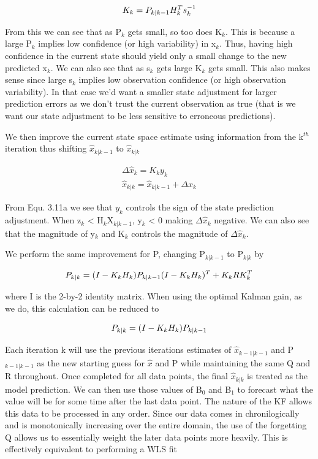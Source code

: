     \begin{equation}
  \centering
K_{k} = P_{k|k-1}H_{k}^{T}s_{k}^{-1}
  \end{equation}
  
  From this we can see that as P$_{k}$ gets small, so too does K$_{k}$. This is because a large P$_{k}$ implies low confidence (or high variability) in x$_{k}$. Thus, having high confidence in the current state should yield only a small change to the new predicted x$_{k}$. We can also see that as s$_{k}$ gets large K$_{k}$ gets small. This also makes sense since large s$_{k}$ implies low observation confidence (or high observation variability). In that case we'd want a smaller state adjustment for larger prediction errors as we don't trust the  current observation as true (that is we want our state adjustment to be less sensitive to erroneous predictions).
  
  We then improve the current state space estimate using information from the k$^{th}$ iteration thus shifting $\hat{x}_{k|k-1}$ to $\hat{x}_{k|k}$
  
      \begin{subequations}
      \begin{align}
    \Delta\hat{x}_{k} = K_{k}y_{k} \\
    \hat{x}_{k|k} = \hat{x}_{k|k-1} + \Delta\hat{x}_{k}
    \end{align}
  \end{subequations}

From Equ. 3.11a we see that $y_{k}$ controls the sign of the state prediction adjustment. When z$_{k}$ < H$_{k}$X$_{k|k-1}$, y$_{k}$ < 0 making $\Delta\hat{x}_{k}$ negative. We can also see that the magnitude of y$_{k}$ and K$_{k}$ controls the magnitude of $\Delta\hat{x}_{k}$.

We perform the same improvement for P, changing P$_{k|k-1}$ to P$_{k|k}$ by

\begin{equation} 
\centering
P_{k|k} = (I - K_{k}H_{k})P_{k|k-1}(I - K_{k}H_{k})^{T} + K_{k}RK_{k}^{T}
\end{equation}

where I is the 2-by-2 identity matrix. When using the optimal Kalman gain, as we do, this calculation can be reduced to 

\begin{equation} 
\centering
P_{k|k} = (I - K_{k}H_{k})P_{k|k-1}
\end{equation}

Each iteration k will use the previous iterations estimates of $\hat{x}_{k-1|k-1}$ and P$_{k-1|k-1}$ as the new starting guess for $\hat{x}$ and P while maintaining the same Q and R throughout. Once completed for all data points, the final $\hat{x}_{k|k}$ is treated as the model prediction. We can then use those values of B$_{0}$ and B$_{1}$ to forecast what the value will be for some time after the last data point. The nature of the KF allows this data to be processed in any order. Since our data comes in chronilogically and is monotonically increasing over the entire domain, the use of the forgetting Q allows us to essentially weight the later data points more heavily. This is effectively equivalent to performing a WLS fit

